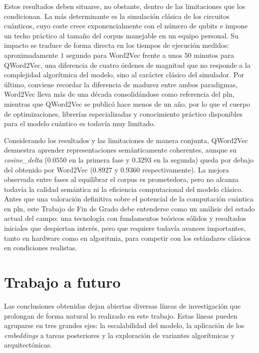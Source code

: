 Estos resultados deben situarse, no obstante, dentro de las limitaciones que los condicionan. La más determinante es la simulación clásica de los circuitos cuánticos, cuyo coste crece exponencialmente con el número de qubits e impone un techo práctico al tamaño del corpus manejable en un equipo personal. Su impacto se traduce de forma directa en los tiempos de ejecución medidos: aproximadamente $1$ segundo para Word2Vec frente a unos $50$ minutos para QWord2Vec, una diferencia de cuatro órdenes de magnitud que no responde a la complejidad algorítmica del modelo, sino al carácter clásico del simulador. Por último, conviene recordar la diferencia de madurez entre ambos paradigmas, Word2Vec lleva más de una década consolidándose como referencia del \gls{pln}, mientras que QWord2Vec se publicó hace menos de un año, por lo que el cuerpo de optimizaciones, librerías especializadas y conocimiento práctico disponibles para el modelo cuántico es todavía muy limitado.

Considerando los resultados y las limitaciones de manera conjunta, QWord2Vec demuestra aprender representaciones semánticamente coherentes, aunque su \textit{cosine\_delta} ($0.0550$ en la primera fase y $0.3293$ en la segunda) queda por debajo del obtenido por Word2Vec ($0.8927$ y $0.9360$ respectivamente). La mejora observada entre fases al equilibrar el corpus es prometedora, pero no alcanza todavía la calidad semántica ni la eficiencia computacional del modelo clásico. Antes que una valoración definitiva sobre el potencial de la computación cuántica en \gls{pln}, este Trabajo de Fin de Grado debe entenderse como un análisis del estado actual del campo: una tecnología con fundamentos teóricos sólidos y resultados iniciales que despiertan interés, pero que requiere todavía avances importantes, tanto en hardware como en algoritmia, para competir con los estándares clásicos en condiciones realistas.


\section{Trabajo a futuro}

Las conclusiones obtenidas dejan abiertas diversas líneas de investigación que prolongan de forma natural lo realizado en este trabajo. Estas líneas pueden agruparse en tres grandes ejes: la escalabilidad del modelo, la aplicación de los \textit{embeddings} a tareas posteriores y la exploración de variantes algorítmicas y arquitectónicas.

